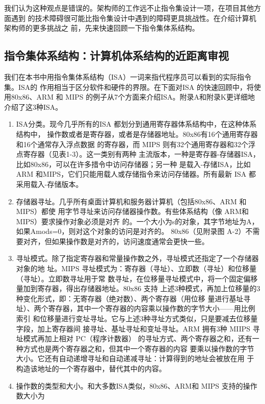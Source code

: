 我们认为这种观点是错误的。架构师的工作远不止指令集设计一项，在项目其他方面遇到
的技术障碍很可能比指令集设计中遇到的障碍更具挑战性。在介绍计算机架构师的更多挑战之
前，先来快速回顾一下指令集体系结构。

\subsection{指令集体系结构：计算机体系结构的近距离审视}
我们在本书中用指令集体系结构（ISA）一词来指代程序员可以看到的实际指令集。ISA的
作用相当于区分软件和硬件的界限。在下面对ISA 的快速回顾中，将使用80x86、ARM 和 MIPS
的例子从7个方面来介绍ISA。附录A和附录K更详细地介绍了这3种ISA。

\begin{enumerate}
    \item ISA分类。现今几乎所有的ISA 都划分到通用寄存器体系结构中，在这种体系结构中，
    操作数或者是寄存器，或者是存储器地址。80x86有16个通用寄存器和16个通常存入浮点数据
    的寄存器，而 MIPS 则有32个通用寄存器和32个浮点寄存器（见表1-3）。这一类别有两种
    主流版本，一种是寄存器-存储器ISA，比如80x86，可以在许多措令中访问存储器；另一种
    是载入-存储ISA，比如ARM 和MIPS，它们只能用载人或存储指令来访问存储器。所有最新
    ISA 都采用载入-存储版本。
    \item 存储器寻址。几乎所有桌面计算机和服务器计算机（包括80x86、ARM 和 MIPS）都使
    用字节寻址来访问存储器操作数。有些体系结构（像 ARM和 MIPS）要求操作对象必须是对齐
    的。一个大小为s的对象，其字节地址为A，如果Amods=0，则对这个对象的访问是对齐的。
    80x86（见附录图 A-2）不需要对齐，但如果操作数是对齐的，访问速度通常会更快一些。
    \item 寻址模式。除了指定寄存器和常量操作数之外，寻址模式还指定了一个存储器对象的地
    址。MIPS 寻址模式为：寄存器（寻址）、立即数（寻址）和位移量（寻址）。立即数寻址用于常
    数寻址，在位移量寻址模式中，将一个固定偏移量加到寄存器，得出存储器地址。80x86 支持
    上述3种模式，再加上位移量的3种变化形式，即：无寄存器（绝对数）、两个寄存器（用位移
    量进行基址寻址）、两个寄存器，其中一个寄存器的内容乘以操作数的字节大小——用比例索引
    和位移量进行变址寻址。它与上述3种寻址方式类似，只是要减去位移量字段，加上寄存器间
    接寻址、基址寻址和变址寻址。ARM 拥有3种 MIIPS 寻址模式再加上相对 PC（程序计数器）
    的寻址方式、两个寄存器之和，还有一种方式也是两个寄存器之和，但其中一个寄存器的内容
    要乘以操作数的字节大小。它还有自动递增寻址和自动递减寻址：计算得到的地址会被放在用
    于构造该地址的一个寄存器中，替代其中的内容。
    \item 操作数的类型和大小。和大多数ISA类似，80x86、ARM和 MIPS 支持的操作数大小为

\end{enumerate}
